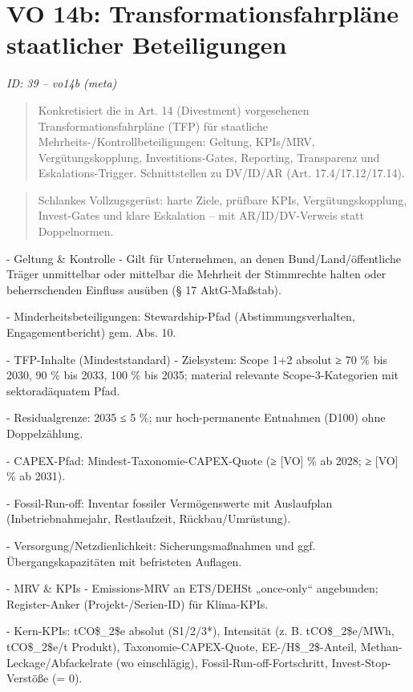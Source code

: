 \documentclass[12pt,a4paper]{scrartcl}
\begin{document}
\section[VO 14b: Transformationsfahrpläne staatlicher Beteiligungen]{VO 14b: Transformationsfahrpläne staatlicher Beteiligungen}
\noindent\textit{ID: 39 -- vo14b (meta)}

\begin{quote}
Konkretisiert die in Art. 14 (Divestment) vorgesehenen Transformationsfahrpläne (TFP) für staatliche Mehrheits-/Kontrollbeteiligungen: Geltung, KPIs/MRV, Vergütungskopplung, Investitions-Gates, Reporting, Transparenz und Eskalations-Trigger. Schnittstellen zu DV/ID/AR (Art. 17.4/17.12/17.14).
\end{quote}

{\footnotesize\begin{quote}
Schlankes Vollzugsgerüst: harte Ziele, prüfbare KPIs, Vergütungskopplung, Invest-Gates und klare Eskalation -- mit AR/ID/DV-Verweis statt Doppelnormen.
\end{quote}}


- Geltung \& Kontrolle
- Gilt für Unternehmen, an denen Bund/Land/öffentliche Träger unmittelbar oder mittelbar die Mehrheit der Stimmrechte halten oder beherrschenden Einfluss ausüben (§ 17 AktG-Maßstab).

- Minderheitsbeteiligungen: Stewardship-Pfad (Abstimmungsverhalten, Engagementbericht) gem. Abs. 10.

- TFP-Inhalte (Mindeststandard)
- Zielsystem: Scope 1+2 absolut ≥ 70 \% bis 2030, 90 \% bis 2033, 100 \% bis 2035; material relevante Scope-3-Kategorien mit sektoradäquatem Pfad.

- Residualgrenze: 2035 ≤ 5 \%; nur hoch-permanente Entnahmen (D100) ohne Doppelzählung.

- CAPEX-Pfad: Mindest-Taxonomie-CAPEX-Quote (≥ [VO] \% ab 2028; ≥ [VO] \% ab 2031).

- Fossil-Run-off: Inventar fossiler Vermögenswerte mit Auslaufplan (Inbetriebnahmejahr, Restlaufzeit, Rückbau/Umrüstung).

- Versorgung/Netzdienlichkeit: Sicherungsmaßnahmen und ggf. Übergangskapazitäten mit befristeten Auflagen.

- MRV \& KPIs
- Emissions-MRV an ETS/DEHSt „once-only“ angebunden; Register-Anker (Projekt-/Serien-ID) für Klima-KPIs.

- Kern-KPIs: tCO\$\_2\$e absolut (S1/2/3*), Intensität (z. B. tCO\$\_2\$e/MWh, tCO\$\_2\$e/t Produkt), Taxonomie-CAPEX-Quote, EE-/H\$\_2\$-Anteil, Methan-Leckage/Abfackelrate (wo einschlägig), Fossil-Run-off-Fortschritt, Invest-Stop-Verstöße (= 0).
\end{document}
